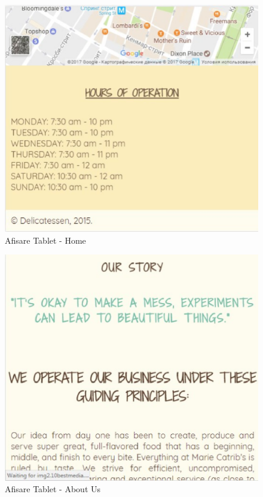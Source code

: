 \documentclass[11pt]{article}
\begin{document}
\begin{figure}[h]
\includegraphics{images/129.eps}
\caption{Afisare Tablet - Home}
\end{figure}

\begin{figure}[h]
\includegraphics{images/13.eps}
\caption{Afisare Tablet - About Us}
\end{figure}
\end{document}
